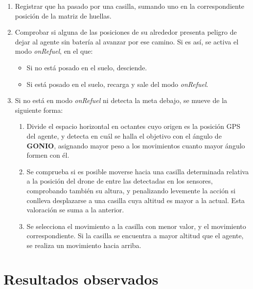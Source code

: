\documentclass[11pt,a4paper]{article}
\begin{document}
\begin{enumerate}
	\item Registrar que ha pasado por una casilla, sumando uno en la correspondiente posición de la matriz de huellas.
	\item Comprobar si alguna de las posiciones de su alrededor presenta peligro de dejar al agente sin batería al avanzar por ese camino. Si es así, se activa el modo \textit{onRefuel}, en el que:
	
	\begin{itemize}
		\item Si no está posado en el suelo, desciende.
		\item Si está posado en el suelo, recarga y sale del modo \textit{onRefuel}.
	\end{itemize}
	
	\item Si no está en modo \textit{onRefuel}  ni detecta la meta debajo, se mueve de la siguiente forma:
	\begin{enumerate}
		\item Divide el espacio horizontal en octantes cuyo origen es la posición GPS del agente, y detecta en cuál se halla el objetivo con el ángulo de \textbf{GONIO}, asignando mayor peso a los movimientos cuanto mayor ángulo formen con él.
		\item Se comprueba si es posible moverse hacia una casilla determinada relativa a la posición del drone de entre las detectadas en los sensores, comprobando también su altura, y penalizando levemente la acción si conlleva desplazarse a una casilla cuya altitud es mayor a la actual. Esta valoración se suma a la anterior.
		\item Se selecciona el movimiento a la casilla con menor valor, y el movimiento correspondiente. Si la casilla se encuentra a mayor altitud que el agente, se realiza un movimiento hacia arriba.
	\end{enumerate}
\end{enumerate}

\section{Resultados observados}
\end{document}

